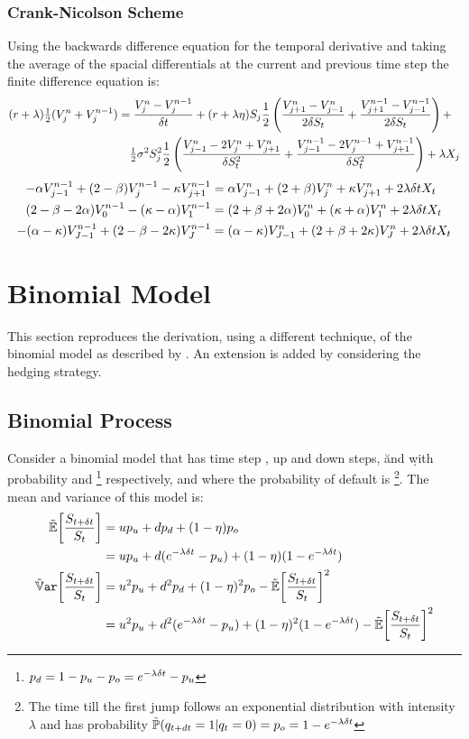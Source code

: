 \documentclass[a4paper,11pt,oneside]{report}
\theoremstyle{plain}
\theoremstyle{definition}
\begin{document}
\subsection{Crank-Nicolson Scheme}
Using the backwards difference equation for the temporal derivative and taking the average of the spacial differentials at the current and previous time step the finite difference equation is:
\small\begin{align*}
 (r + \lambda)\tfrac{1}{2}(V^{n}_j + V^{n - 1}_j) &= \frac{V^{n}_j - V^{n - 1}_j}{\delta t} + (r + \lambda\eta)S_j\frac{1}{2}\left(\frac{V^{n}_{j + 1} - V^{n}_{j - 1}}{2\delta S_t} + \frac{V^{n - 1}_{j + 1} - V^{n - 1}_{j - 1}}{2\delta S_t}\right) + \\
  &\quad \tfrac{1}{2}\sigma^2S_j^2\frac{1}{2}\left(\frac{V^{n}_{j - 1} - 2V^{n}_j + V^{n}_{j + 1}}{\delta S_t^2} + \frac{V^{n - 1}_{j - 1} - 2V^{n - 1}_j + V^{n - 1}_{j + 1}}{\delta S_t^2}\right) + \lambda X_j
\end{align*}
\begin{align}
 -\alpha V^{n - 1}_{j - 1} + (2 - \beta)V^{n - 1}_j - \kappa V^{n - 1}_{j + 1} &= \alpha V^{n}_{j - 1} + (2 + \beta)V^{n}_j + \kappa V^{n}_{j + 1} + 2\lambda\delta tX_t \\
 (2 - \beta - 2\alpha)V^{n - 1}_{0} - (\kappa - \alpha)V^{n - 1}_{1} &= (2 + \beta + 2\alpha)V^{n}_{0} + (\kappa + \alpha)V^{n}_{1} + 2\lambda\delta tX_t \\
 -(\alpha - \kappa)V^{n - 1}_{J - 1} + (2 - \beta - 2\kappa)V^{n - 1}_{J} &= (\alpha - \kappa)V^{n}_{J - 1} + (2 + \beta + 2\kappa)V^{n}_{J} + 2\lambda\delta tX_t
\end{align}\normalsize


\chapter{Binomial Model}
This section reproduces the derivation, using a different technique, of the binomial model as described by \citet{MK12}.  An extension is added by considering the hedging strategy.


\section{Binomial Process}
Consider a binomial model that has time step \Dt, up and down steps, \u and \d with probability \pu and \pd\footnote{$p_d = 1 - p_u - p_o = e^{-\lambda\delta t} - p_u$} respectively, and where the probability of default is \po\footnote{The time till the first jump follows an exponential distribution with intensity $\lambda$ and has probability $\Prob(q_{t + \dt} = 1 | q_t = 0) = \po = 1 - e^{-\lambda\Dt}$}.  The mean and variance of this model is:
\begin{align}
 \E[\frac{\SDt}{\S}]   &= \u\pu + \d\pd + (1 - \eta)\po \n
                       &= \u\pu + \d(e^{-\lambda\Dt} - \pu) + (1 - \eta)(1 - e^{-\lambda\Dt}) \label{eq:BM_E} \\
 \Var[\frac{\SDt}{\S}] &= \u^2\pu + \d^2\pd + (1 - \eta)^2\po - \E[\frac{\SDt}{\S}]^2 \n
                       &= \u^2\pu + \d^2(e^{-\lambda\Dt} - \pu) + (1 - \eta)^2(1 - e^{-\lambda\Dt}) - \E[\frac{\SDt}{\S}]^2 \label{eq:BM_Var}
\end{align}
\end{document}
